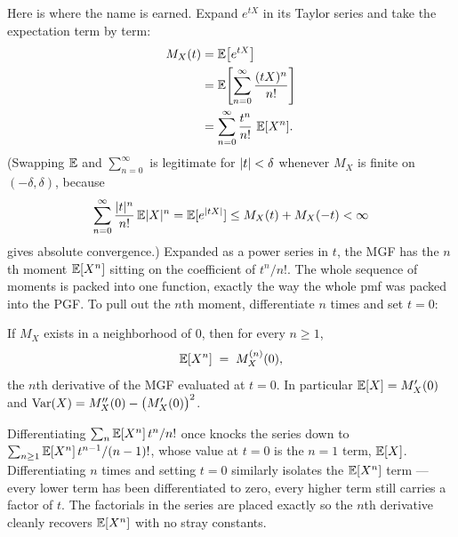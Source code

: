 Here is where the name is earned. Expand $e^{tX}$ in its Taylor series and take
the expectation term by term:
\begin{align*}
  M_X(t) &= \operatorname{\mathbb{E}}\!\left[e^{tX}\right] \\
         &= \operatorname{\mathbb{E}}\!\left[\sum_{n=0}^\infty \frac{(tX)^n}{n!}\right] \\
         &= \sum_{n=0}^\infty \frac{t^n}{n!}\,\operatorname{\mathbb{E}}[X^n].
\end{align*}
(Swapping $\operatorname{\mathbb{E}}$ and $\sum_{n=0}^\infty$ is legitimate for $\lvert t\rvert < \delta$ whenever
$M_X$ is finite on $(-\delta,\delta)$, because
\[
  \sum_{n=0}^\infty \frac{\lvert t\rvert^n}{n!}\operatorname{\mathbb{E}}\lvert X\rvert^n = \operatorname{\mathbb{E}}[e^{\lvert tX\rvert}] \le M_X(t) + M_X(-t) < \infty
\]
gives absolute convergence.)
Expanded as a power series in $t$, the MGF has the
$n$th moment $\operatorname{\mathbb{E}}[X^n]$ sitting on the coefficient of $t^n/n!$. The whole
sequence of moments is packed into one function, exactly the way the whole pmf
was packed into the PGF. To pull out the $n$th moment, differentiate $n$ times
and set $t=0$:

\begin{proposition}
\label{ch18:prop-mgf-moments}
If $M_X$ exists in a neighborhood of $0$, then for every $n\ge 1$,
\[
  \operatorname{\mathbb{E}}[X^n] \;=\; M_X^{(n)}(0),
\]
the $n$th derivative of the MGF evaluated at $t=0$. In particular
$\operatorname{\mathbb{E}}[X]=M_X'(0)$ and $\operatorname{Var}(X)=M_X''(0)-\big(M_X'(0)\big)^2$.
\end{proposition}

\begin{whybox}
Differentiating $\sum_n \operatorname{\mathbb{E}}[X^n]\,t^n/n!$ once knocks the series down to
$\sum_{n\ge 1}\operatorname{\mathbb{E}}[X^n]\,t^{n-1}/(n-1)!$, whose value at $t=0$ is the $n=1$ term,
$\operatorname{\mathbb{E}}[X]$. Differentiating $n$ times and setting $t=0$ similarly isolates the
$\operatorname{\mathbb{E}}[X^n]$ term --- every lower term has been differentiated to zero, every
higher term still carries a factor of $t$. The factorials in the series are
placed exactly so the $n$th derivative cleanly recovers $\operatorname{\mathbb{E}}[X^n]$ with no stray
constants. 
\end{whybox}


